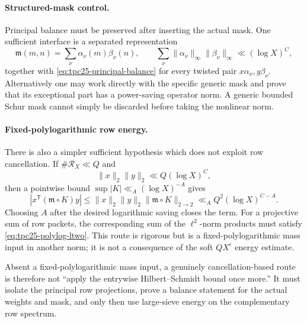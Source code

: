 \paragraph{Structured-mask control.}
Principal balance must be preserved after inserting the actual mask.
One sufficient interface is a separated representation
\begin{equation}
 \mathfrak m(m,n)=\sum_\nu\alpha_\nu(m)\beta_\nu(n),
 \qquad
 \sum_\nu\|\alpha_\nu\|_\infty
 \|\beta_\nu\|_\infty\ll(\log X)^C,
 \label{eq:tpc25-mask-projective-control}
\end{equation}
together with \eqref{eq:tpc25-principal-balance} for every twisted pair
\(x\alpha_\nu,y\beta_\nu\).  Alternatively one may work directly with
the specific generic mask and prove that its exceptional part has a
power-saving operator norm.  A generic bounded Schur mask cannot simply
be discarded before taking the nonlinear norm.

\paragraph{Fixed-polylogarithmic row energy.}
There is also a simpler sufficient hypothesis which does not exploit
row cancellation.  If \(\#\mathcal R_X\ll Q\) and
\begin{equation}
 \|x\|_2\|y\|_2\ll Q(\log X)^C,
 \label{eq:tpc25-polylog-ltwo}
\end{equation}
then a pointwise bound
\(\sup|K|\ll_A(\log X)^{-A}\) gives
\[
 |x^{\mathsf T}(\mathfrak m\circ K)y|
 \le \|x\|_2\|y\|_2
 \|\mathfrak m\circ K\|_{2\to2}
 \ll_A Q^2(\log X)^{C-A}.
\]
Choosing \(A\) after the desired logarithmic saving closes the term.
For a projective sum of row packets, the corresponding sum of the
\(\ell^2\)-norm products must satisfy
\eqref{eq:tpc25-polylog-ltwo}.  This route is rigorous but is a
fixed-polylogarithmic mass input in another norm; it is not a consequence
of the soft \(QX^\epsilon\) energy estimate.

Absent a fixed-polylogarithmic mass input, a genuinely
cancellation-based route is therefore not ``apply the entrywise
Hilbert--Schmidt bound once more.''  It must isolate the principal row
projections, prove a balance statement for the actual weights and mask,
and only then use large-sieve energy on the complementary row spectrum.
